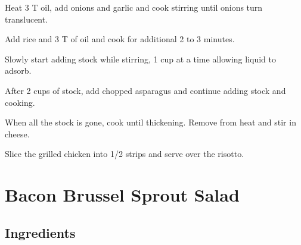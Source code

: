 \documentclass[ansiapaper,10pt,english]{sphinxmanual}
\begin{document}
Heat 3 T oil, add onions and garlic and cook stirring until onions turn translucent.

Add rice and 3 T of oil and cook for additional 2 to 3 minutes.

Slowly start adding stock while stirring, 1 cup at a time allowing liquid to adsorb.

After 2 cups of stock, add chopped asparagus and continue adding stock and cooking.

When all the stock is gone, cook until thickening.  Remove from heat and stir in cheese.

Slice the grilled chicken into 1/2 strips and serve over the risotto.


\chapter{Bacon Brussel Sprout Salad}
\label{\detokenize{baconbrussel:bacon-brussel-sprout-salad}}\label{\detokenize{baconbrussel::doc}}

\section{Ingredients}
\label{\detokenize{baconbrussel:ingredients}}
%
\begin{sphinxVerbatim}[commandchars=\\\{\}]
 

 

   

   

  

      

   

  

    
\end{sphinxVerbatim}
\end{document}
